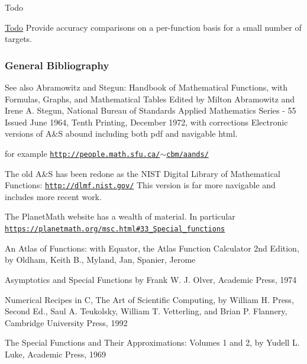 \begin{DoxyRefDesc}{Todo}
\item[\hyperlink{todo__todo000001}{Todo}]Provide accuracy comparisons on a per-\/function basis for a small number of targets.\end{DoxyRefDesc}
\hypertarget{group__mathsf_mathsf_bibliography}{}\subsubsection{General Bibliography}\label{group__mathsf_mathsf_bibliography}
\begin{DoxySeeAlso}{See also}
Abramowitz and Stegun\+: Handbook of Mathematical Functions, with Formulas, Graphs, and Mathematical Tables Edited by Milton Abramowitz and Irene A. Stegun, National Bureau of Standards Applied Mathematics Series -\/ 55 Issued June 1964, Tenth Printing, December 1972, with corrections Electronic versions of A\&S abound including both pdf and navigable html. 

for example \href{http://people.math.sfu.ca/~cbm/aands/}{\tt http\+://people.\+math.\+sfu.\+ca/$\sim$cbm/aands/}

The old A\&S has been redone as the N\+I\+ST Digital Library of Mathematical Functions\+: \href{http://dlmf.nist.gov/}{\tt http\+://dlmf.\+nist.\+gov/} This version is far more navigable and includes more recent work.

The Planet\+Math website has a wealth of material. In particular \href{https://planetmath.org/msc.html#33_Special_functions}{\tt https\+://planetmath.\+org/msc.\+html\#33\+\_\+\+Special\+\_\+functions}

An Atlas of Functions\+: with Equator, the Atlas Function Calculator 2nd Edition, by Oldham, Keith B., Myland, Jan, Spanier, Jerome

Asymptotics and Special Functions by Frank W. J. Olver, Academic Press, 1974

Numerical Recipes in C, The Art of Scientific Computing, by William H. Press, Second Ed., Saul A. Teukolsky, William T. Vetterling, and Brian P. Flannery, Cambridge University Press, 1992

The Special Functions and Their Approximations\+: Volumes 1 and 2, by Yudell L. Luke, Academic Press, 1969 
\end{DoxySeeAlso}
